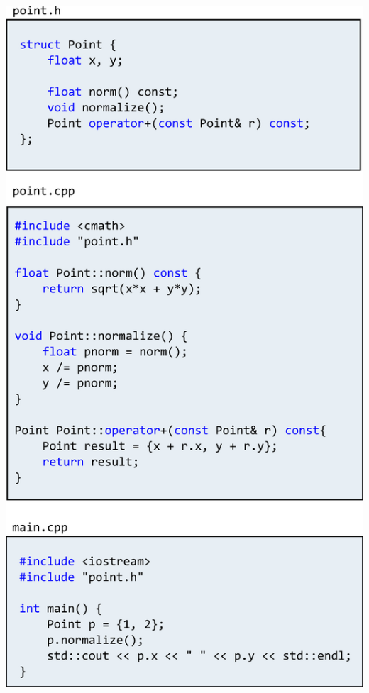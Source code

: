 \documentclass{article}
\begin{document}
\begin{center}
\includegraphics[scale=0.65]{../images/sepcompilation.png}
\end{center}
\end{document}
